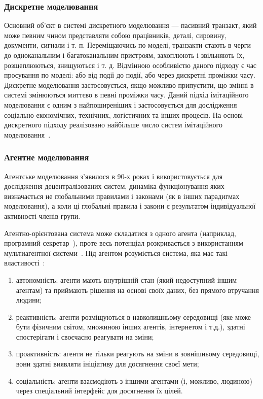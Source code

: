 \subsubsection{Дискретне моделювання}
Основний об'єкт в системі дискретного моделювання --- пасивний транзакт, який може певним чином представляти собою працівників, деталі, сировину, документи, сигнали і т. п.
Переміщаючись по моделі, транзакти стають в черги до одноканальним і багатоканальним пристроям, захоплюють і звільняють їх, розщеплюються, знищуються і т. д.
Відмінною особливістю даного підходу є час просування по моделі: або від події до події, або через дискретні проміжки часу.
Дискретне моделювання застосовується, якщо можливо припустити, що змінні в системі змінюються миттєво в певні проміжки часу.
Даний підхід імітаційного моделювання є одним з найпоширеніших і застосовується для дослідження соціально-економічних, технічних, логістичних та інших процесів.
На основі дискретного підходу реалізовано найбільше
число систем імітаційного моделювання~\cite{Shamrin2016}.

\subsubsection{Агентне моделювання}
Агентське моделювання з'явилося в 90-х роках і використовується для дослідження децентралізованих систем, динаміка функціонування яких визначається не глобальними правилами і законами (як в інших парадигмах моделювання), а коли ці глобальні правила і закони є результатом індивідуальної активності членів групи.

Агентно-орієнтована система може складатися з одного агента (наприклад, програмний секретар~\cite{Maes1995}), проте весь потенціал розкривається з використанням мультиагентної системи~\cite{Waters1989}.
Під агентом розуміється система, яка має такі властивості~\cite{Jennings1998,Wooldridge1995}:
\begin{enumerate}[label={\arabic*)}]
	\item автономність: агенти мають внутрішній стан (який недоступний іншим агентам) та приймають рішення на основі своїх даних, без прямого втручання людини;
	\item реактивність: агенти розміщуються в навколишньому середовищі (яке може бути фізичним світом, множиною інших агентів, інтернетом і т.д.), здатні спостерігати і своєчасно реагувати на зміни;
	\item проактивність: агенти не тільки реагують на зміни в зовнішньому середовищі, вони здатні виявляти ініціативу для досягнення своєї мети;
	\item соціальність: агенти взаємодіють з іншими агентами (і, можливо, людиною) через спеціальний інтерфейс для досягнення їх цілей.
\end{enumerate}

